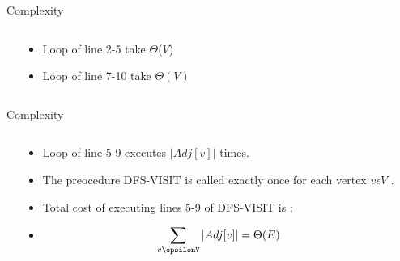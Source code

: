 \documentclass{beamer}
\begin{document}
\begin{frame}{Complexity}
    \begin{columns}

        \begin{center}
            
        \end{center}
            

        

        \begin{center}
            \begin{itemize}
                        \item<1-> Loop of line 2-5 take $\Theta$($V$)
                        \item<2-> Loop of line 7-10 take $\Theta(V)$
                    \end{itemize}
        \end{center}
        

    \end{columns}
\end{frame}



    \begin{frame}{Complexity}
        \begin{columns}
        
                \begin{center}
                    
                \end{center}
             
             
             
                \begin{center}
                
                    \begin{itemize}
                        \item<1-> Loop of line 5-9 executes $|Adj[v]|$ times.
                        \item<2-> The preocedure DFS-VISIT is called exactly once for each vertex $v \epsilon V$ .
                        \item<3-> Total cost of executing lines 5-9 of DFS-VISIT is :
                        \item<4-> $$\sum_{v\epsilonV} |Adj[v]| = \Theta(E)$$
                    \end{itemize}
                    
                \end{center}
        
        \end{columns}
    
    
    
    \end{frame}
    
\end{document}
